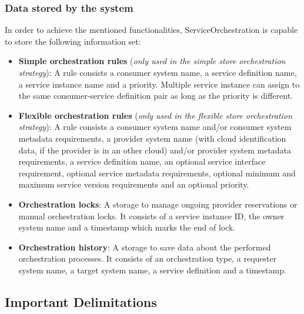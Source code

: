 \documentclass[a4paper]{arrowhead}
\begin{document}
\subsubsection {Data stored by the system}
In order to achieve the mentioned functionalities, ServiceOrchestration is capable to store the following information set:

\begin{itemize}
    \item \textbf{Simple orchestration rules} (\textit{only used in the simple store orchestration strategy}): A rule consists a consumer system name, a service definition name, a service instance name and a priority. Multiple service instance can assign to the same consumer-service definition pair as long as the priority is different.
    \item \textbf{Flexible orchestration rules} (\textit{only used in the flexible store orchestration strategy}): A rule consists a consumer system name and/or consumer system metadata requirements, a provider system name (with cloud identification data, if the provider is in an other cloud) and/or provider system metadata requirements, a service definition name, an optional service interface requirement, optional service metadata requirements, optional minimum and maximum service version requirements and an optional priority.
    \item \textbf{Orchestration locks}: A storage to manage ongoing provider reservations or manual orchestration locks. It consists of a service instance ID, the owner system name and a timestamp which marks the end of lock.
    \item \textbf{Orchestration history}: A storage to save data about the performed orchestration processes. It consists of an orchestration type, a requester system name, a target system name, a service definition and a timestamp.
\end{itemize}

\subsection{Important Delimitations}
\label{sec:delimitations}
\end{document}
